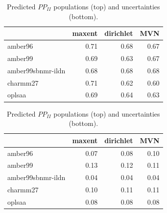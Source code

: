 \documentclass[12pt]{article}
\begin{document}
\begin{table}

\begin{tabular}{lrrr}
\toprule
{} &  maxent &  dirichlet &  MVN \\
\midrule
amber96           &    0.71 &       0.68 & 0.67 \\
amber99           &    0.69 &       0.63 & 0.67 \\
amber99sbnmr-ildn &    0.68 &       0.68 & 0.68 \\
charmm27          &    0.71 &       0.62 & 0.60 \\
oplsaa            &    0.69 &       0.64 & 0.63 \\
\bottomrule
\end{tabular}


\begin{tabular}{lrrr}
\toprule
{} &  maxent &  dirichlet &  MVN \\
\midrule
amber96           &    0.07 &       0.08 & 0.10 \\
amber99           &    0.13 &       0.12 & 0.11 \\
amber99sbnmr-ildn &    0.04 &       0.04 & 0.04 \\
charmm27          &    0.10 &       0.11 & 0.11 \\
oplsaa            &    0.08 &       0.08 & 0.08 \\
\bottomrule
\end{tabular}

\caption{
Predicted $PP_{II}$ populations (top) and uncertainties (bottom).  
}
\end{table}

\clearpage
\end{document}
